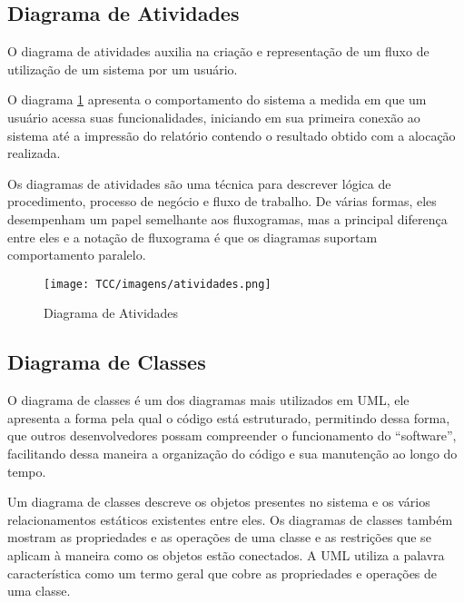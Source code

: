 \subsection{Diagrama de Atividades}
 
 O diagrama de atividades auxilia na criação e representação de um fluxo de utilização de um sistema por um usuário.
 
 O diagrama \ref{Diagrama Atividades} apresenta o comportamento do sistema a medida em que um usuário acessa suas funcionalidades, iniciando em sua  primeira conexão ao sistema até a impressão do relatório contendo o resultado obtido com a alocação realizada.
 
 \begin{citacao}
     Os diagramas de atividades são uma técnica para descrever lógica de procedimento, processo de negócio e fluxo de trabalho. De várias formas, eles desempenham um papel semelhante aos fluxogramas, mas a principal diferença entre eles e a notação de fluxograma é que os diagramas suportam comportamento paralelo. \cite[p. 118]{fowler07}
 \end{citacao}
 
\begin{figure}[H]
     \centering
     \texttt{[image: TCC/imagens/atividades.png]}
     \caption{Diagrama de Atividades}
     \label{Diagrama Atividades}
\end{figure}

 
 
\subsection{Diagrama de Classes}

O diagrama de classes é um dos diagramas mais utilizados em UML, ele apresenta a forma pela qual o código está estruturado, permitindo dessa forma, que outros desenvolvedores possam compreender o funcionamento do “software”, facilitando dessa maneira a organização do código e sua manutenção ao longo do tempo.


 \begin{citacao}
      Um diagrama de classes descreve os objetos presentes no sistema e os vários relacionamentos estáticos existentes entre eles. Os diagramas de classes também mostram as propriedades e as operações de uma classe e as restrições que se aplicam à maneira como os objetos estão conectados. A UML utiliza a palavra característica como um termo geral que cobre as propriedades e operações de uma classe. \cite[p. 52]{fowler07}
 \end{citacao}
 
